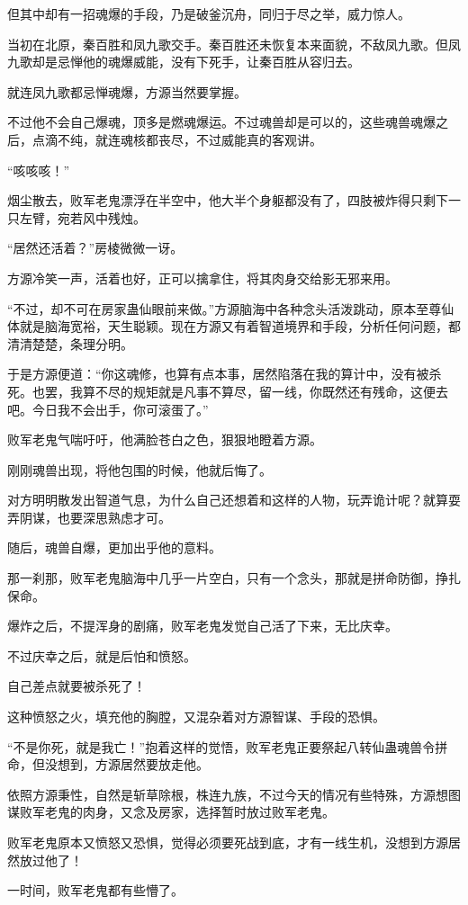 \begin{this_body}
但其中却有一招魂爆的手段，乃是破釜沉舟，同归于尽之举，威力惊人。

当初在北原，秦百胜和凤九歌交手。秦百胜还未恢复本来面貌，不敌凤九歌。但凤九歌却是忌惮他的魂爆威能，没有下死手，让秦百胜从容归去。

就连凤九歌都忌惮魂爆，方源当然要掌握。

不过他不会自己爆魂，顶多是燃魂爆运。不过魂兽却是可以的，这些魂兽魂爆之后，点滴不纯，就连魂核都丧尽，不过威能真的客观讲。

“咳咳咳！”

烟尘散去，败军老鬼漂浮在半空中，他大半个身躯都没有了，四肢被炸得只剩下一只左臂，宛若风中残烛。

“居然还活着？”房棱微微一讶。

方源冷笑一声，活着也好，正可以擒拿住，将其肉身交给影无邪来用。

“不过，却不可在房家蛊仙眼前来做。”方源脑海中各种念头活泼跳动，原本至尊仙体就是脑海宽裕，天生聪颖。现在方源又有着智道境界和手段，分析任何问题，都清清楚楚，条理分明。

于是方源便道：“你这魂修，也算有点本事，居然陷落在我的算计中，没有被杀死。也罢，我算不尽的规矩就是凡事不算尽，留一线，你既然还有残命，这便去吧。今日我不会出手，你可滚蛋了。”

败军老鬼气喘吁吁，他满脸苍白之色，狠狠地瞪着方源。

刚刚魂兽出现，将他包围的时候，他就后悔了。

对方明明散发出智道气息，为什么自己还想着和这样的人物，玩弄诡计呢？就算耍弄阴谋，也要深思熟虑才可。

随后，魂兽自爆，更加出乎他的意料。

那一刹那，败军老鬼脑海中几乎一片空白，只有一个念头，那就是拼命防御，挣扎保命。

爆炸之后，不提浑身的剧痛，败军老鬼发觉自己活了下来，无比庆幸。

不过庆幸之后，就是后怕和愤怒。

自己差点就要被杀死了！

这种愤怒之火，填充他的胸膛，又混杂着对方源智谋、手段的恐惧。

“不是你死，就是我亡！”抱着这样的觉悟，败军老鬼正要祭起八转仙蛊魂兽令拼命，但没想到，方源居然要放走他。

依照方源秉性，自然是斩草除根，株连九族，不过今天的情况有些特殊，方源想图谋败军老鬼的肉身，又念及房家，选择暂时放过败军老鬼。

败军老鬼原本又愤怒又恐惧，觉得必须要死战到底，才有一线生机，没想到方源居然放过他了！

一时间，败军老鬼都有些懵了。


\end{this_body}
